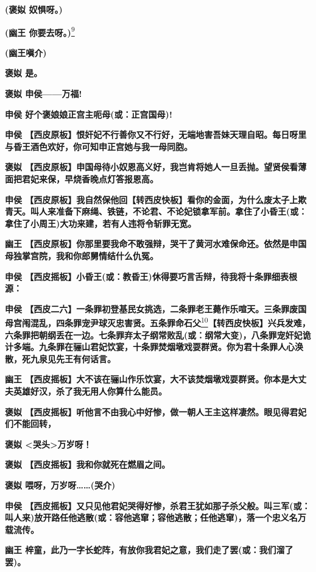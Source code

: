 \textbf{(褒姒 奴惧呀。)}

\textbf{(幽王 你要去呀。)}\protect\hyperlink{fn9}{\textsuperscript{9}}

\textbf{(幽王嗔介)}

\textbf{褒姒 是。}

\textbf{褒姒 申侯------万福!}

\textbf{申侯 好个褒娘娘正宫主呃母(或：正宫国母)!}

\textbf{申侯
【西皮原板】恨奸妃不行善你又不行好，无端地害吾妹天理自昭。每日呀里与昏王酒色欢好，你可知申正宫她与我一母同胞。}

\textbf{褒姒
【西皮原板】申国母待小奴恩高义好，我岂肯将她人一旦丢抛。望贤侯看薄面把君妃来保，早烧香晚点灯答报恩高。}

\textbf{申侯
【西皮原板】我自然保他回【转西皮快板】看你的金面，为什么废太子上欺青天。叫人来准备下麻绳、铁链，不论君、不论妃锁拿军前。拿住了小昏王(或：拿住了小周王)大功来建，若有人违将令斩罪无宽。}

\textbf{幽王
【西皮原板】你那里要我命不敢强辩，哭干了黄河水难保命还。依然是申国母独掌宫院，我和你郎舅情结什么仇冤。}

\textbf{申侯
【西皮摇板】小昏王(或：教昏王)休得要巧言舌辩，待我将十条罪细表根源：}

\textbf{申侯
【西皮二六】一条罪初登基民女挑选，二条罪老王薨作乐喧天。三条罪废国母宫闱混乱，四条罪宠尹球灭忠害贤。五条罪命石父}\protect\hyperlink{fn10}{\textsuperscript{10}}\textbf{【转西皮快板】兴兵发难，六条罪把朝纲丢在一边。七条罪弃太子纲常败乱(或：纲常大变)，八条罪宠奸妃诡计多端。九条罪在骊山君妃饮宴，十条罪焚烟墩戏耍群贤。你为君十条罪人心涣散，死九泉见先王有何话言。}

\textbf{幽王
【西皮摇板】大不该在骊山作乐饮宴，大不该焚烟墩戏耍群贤。你本是大丈夫英雄好汉，杀了我无用人你算什么能员。}

\textbf{褒姒
【西皮摇板】听他言不由我心中好惨，做一朝人王主这样凄然。眼见得君妃们不能回转，}

\textbf{褒姒 \textless{}哭头\textgreater{}万岁呀！}

\textbf{褒姒 【西皮摇板】我和你就死在燃眉之间。}

\textbf{褒姒 喂呀，万岁呀\ldots{}\ldots{}(哭介)}

\textbf{申侯
【西皮摇板】又只见他君妃哭得好惨，杀君王犹如那子杀父般。叫三军(或：叫人来)放开路任他逃散(或：容他逃窜；容他逃散；任他逃窜)，落一个忠义名万载流传。}

\textbf{幽王
梓童，此乃一字长蛇阵，有放你我君妃之意，我们走了罢(或：我们溜了罢)。}


